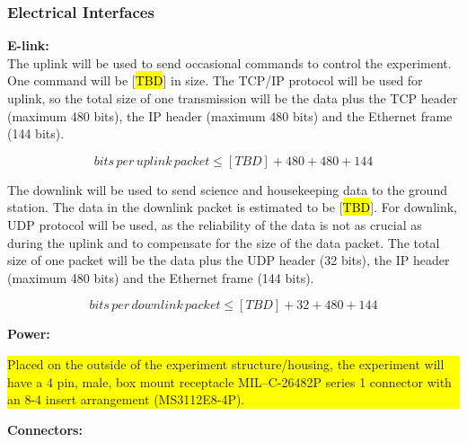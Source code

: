 \label{sec:4.2.2}


\subsubsection{Electrical Interfaces}
\label{sec:4.2.3}
\textbf{E-link:}\\
The uplink will be used to send occasional commands to control the experiment. One command will be [\hl{TBD}] in size. The TCP/IP protocol will be used for uplink, so the total size of one transmission will be the data plus the TCP header (maximum 480 bits), the IP header (maximum 480 bits) and the Ethernet frame (144 bits).

$$ bits\, per\, uplink\, packet \leq [TBD] + 480 + 480 + 144 $$

The downlink will be used to send science and housekeeping data to the ground station. The data in the downlink packet is estimated to be [\hl{TBD}]. For downlink, UDP protocol will be used, as the reliability of the data is not as crucial as during the uplink and to compensate for the size of the data packet. The total size of one packet will be the data plus the UDP header (32 bits), the IP header (maximum 480 bits) and the Ethernet frame (144 bits).

$$ bits\, per\, downlink\, packet \leq [TBD] + 32 + 480 + 144 $$

\textbf{Power:}\\

\colorbox{yellow}{\parbox{\textwidth}{ Placed on the outside of the experiment structure/housing, the experiment will have a 4 pin, male, box mount receptacle MIL–C-26482P series 1 connector with an 8-4 insert arrangement (MS3112E8-4P). }}



\textbf{Connectors:}\\

%

